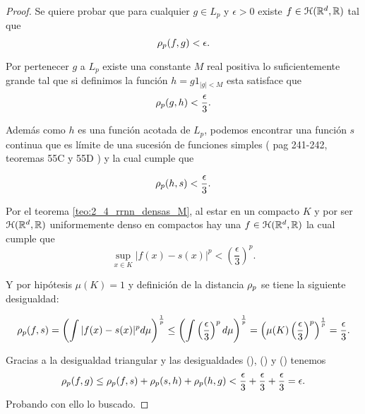 
\begin{proof}
    Se quiere probar que para cualquier $g \in L_p$ y 
    $\epsilon >0$ existe $f \in \mathcal{H}(\mathbb{R}^d,\mathbb{R})$ tal que 
    \begin{equation}
        \rho_{p}(f,g) <\epsilon.
    \end{equation}   
    
    Por pertenecer $g$ a $L_p$ existe una constante $M$ real positiva
    lo suficientemente grande 
    tal que si definimos la función $h =g 1_{|g|<M}$ esta satisface 
    que
    \begin{equation}\label{eq:corolario_2_2:h_compacto}
        \rho_{p}(g,h) < \frac{\epsilon}{3}.
    \end{equation}
    
    Además como $h$ es una función acotada de $L_p$, podemos encontrar
    una función $s$ continua que es límite de una sucesión de
    funciones simples 
    ( pag 241-242,  teoremas 55C y 55D \cite{nla.cat-vn1819421})
    y la cual cumple que 

    \begin{equation}\label{eq:corolario_2_2:s_continua}
        \rho_{p}(h,s) < \frac{\epsilon}{3}.
    \end{equation}

    Por el teorema \ref{teo:2_4_rrnn_densas_M}, al estar en un compacto $K$ y por ser $\mathcal{H}(\mathbb{R}^d,\mathbb{R})$ uniformemente
    denso en compactos hay una $f \in \mathcal{H}(\mathbb{R}^d,\mathbb{R})$ la cual cumple que
    \begin{equation}
        \sup_{x \in K} |f(x) -s(x)|^p 
        <
         \left( \frac{\epsilon}{3}\right) ^p.
    \end{equation}
    
    Y por hipótesis $\mu(K) =1$ y definición de la distancia $\rho_{p}$ 
    se tiene la siguiente desigualdad: 

    \begin{equation} \label{eq:corolario_2_2:cota_rrnn}
        \rho_{p}(f,s) = 
        \left(\int |f(x) - s(x)|^p d\mu \right)^\frac{1}{p}
        \leq 
        \left(\int  \left( \frac{\epsilon}{3}\right) ^p d\mu \right)^\frac{1}{p}
        = \left( \mu(K)  \left(\frac{\epsilon}{3} \right)^p\right) ^\frac{1}{p}
        = \frac{\epsilon}{3}.
    \end{equation}

    Gracias a la desigualdad triangular y las desigualdades
    (),
    () y 
    ()
    tenemos
    \begin{equation}
        \rho_{p}(f,g) 
        \leq
            \rho_{p}(f,s)
            +\rho_{p}(s,h)
            + \rho_{p}(h,g)
        < 
        \frac{\epsilon}{3} + \frac{\epsilon}{3} + \frac{\epsilon}{3}
        = \epsilon.
    \end{equation}
Probando con ello lo buscado. 
\end{proof}  

